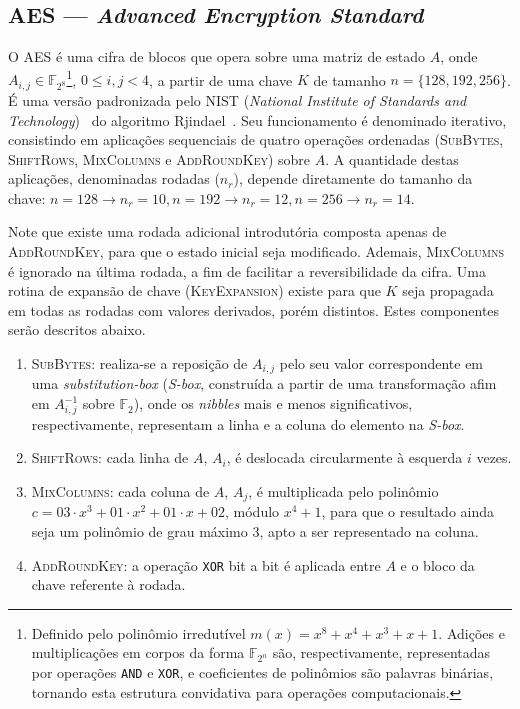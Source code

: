 \documentclass[12pt]{report}
\begin{document}
\subsection{AES --- \emph{Advanced Encryption Standard}}

O AES é uma cifra de blocos que opera sobre uma matriz de estado $A$, onde $A_{i,j} \in \mathbb{F}_{2^{8}}$\footnote{Definido pelo polinômio irredutível $m(x) = x^{8} + x^{4} + x^{3} + x + 1$. Adições e multiplicações em corpos da forma $\mathbb{F}_{2^n}$ são, respectivamente, representadas por operações \texttt{AND} e \texttt{XOR}, e coeficientes de polinômios são palavras binárias, tornando esta estrutura convidativa para operações computacionais.}, $0 \leq i, j < 4$, a partir de uma chave $K$ de tamanho $n = \{128, 192, 256\}$. É uma versão padronizada pelo NIST (\emph{National Institute of Standards and Technology})~\cite{Standards2001} do algoritmo Rjindael~\cite{Daemen:2002:DR:560131}. Seu funcionamento é denominado iterativo, consistindo em aplicações sequenciais de quatro operações ordenadas (\textsc{SubBytes}, \textsc{ShiftRows}, \textsc{MixColumns} e \textsc{AddRoundKey}) sobre $A$. A quantidade destas aplicações, denominadas rodadas ($n_r$), depende diretamente do tamanho da chave: $n = 128 \rightarrow n_r = 10, n = 192 \rightarrow n_r = 12, n = 256 \rightarrow n_r = 14$.

Note que existe uma rodada adicional introdutória composta apenas de \textsc{AddRoundKey}, para que o estado inicial seja modificado. Ademais, \textsc{MixColumns} é ignorado na última rodada, a fim de facilitar a reversibilidade da cifra. Uma rotina de expansão de chave (\textsc{KeyExpansion}) existe para que $K$ seja propagada em todas as rodadas com valores derivados, porém distintos. Estes componentes serão descritos abaixo.

\begin{enumerate}[label=\roman*.]

    \item \textsc{SubBytes}: realiza-se a reposição de $A_{i,j}$
        pelo seu valor correspondente em uma \emph{substitution-box} (\emph{S-box}, construída a partir de uma transformação afim em $A_{i,j}^{-1}$ sobre $\mathbb{F}_2$), onde os \emph{nibbles} mais e menos significativos, respectivamente, representam a linha e a coluna do elemento na \emph{S-box}.

    \item \textsc{ShiftRows}: cada linha de $A$, $A_i$,
        é deslocada circularmente à esquerda $i$ vezes.

    \item \textsc{MixColumns}: cada coluna de $A$, $A_j$, é multiplicada pelo polinômio
        $c = 03 \cdot x^{3} + 01 \cdot x^{2} + 01 \cdot x + 02$, módulo $x^{4} + 1$, para que o resultado ainda seja um polinômio de grau máximo 3, apto a ser representado na coluna.

    \item \textsc{AddRoundKey}: a operação \texttt{XOR} bit a bit é aplicada entre $A$ e o
        bloco da chave referente à rodada.

\end{enumerate}
\end{document}
